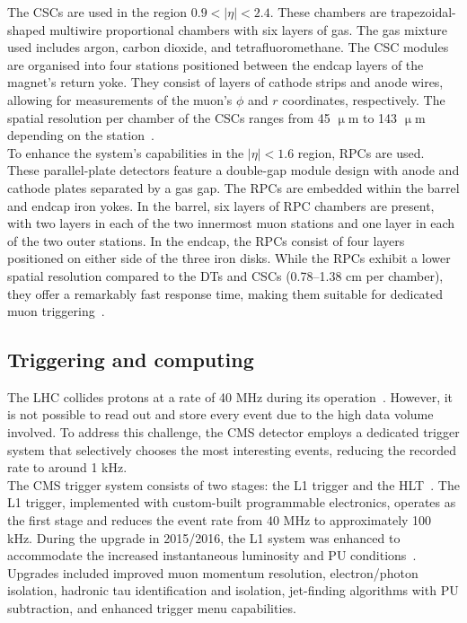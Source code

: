 The \ac{CSC}s are used in the region $0.9 < |\eta| < 2.4$. 
These chambers are trapezoidal-shaped multiwire proportional chambers with six layers of gas. 
The gas mixture used includes argon, carbon dioxide, and tetrafluoromethane. 
The \ac{CSC} modules are organised into four stations positioned between the endcap layers of the magnet's return yoke. 
They consist of layers of cathode strips and anode wires, allowing for measurements of the muon's $\phi$ and $r$ coordinates, respectively. 
The spatial resolution per chamber of the \ac{CSC}s ranges from 45 $\upmu$m to 143 $\upmu$m depending on the station~\cite{CMS:2018rym}. \\

To enhance the system's capabilities in the $|\eta| < 1.6$ region, \ac{RPC}s are used. 
These parallel-plate detectors feature a double-gap module design with anode and cathode plates separated by a gas gap. 
The \ac{RPC}s are embedded within the barrel and endcap iron yokes. 
In the barrel, six layers of \ac{RPC} chambers are present, with two layers in each of the two innermost muon stations and one layer in each of the two outer stations. 
In the endcap, the \ac{RPC}s consist of four layers positioned on either side of the three iron disks. 
While the \ac{RPC}s exhibit a lower spatial resolution compared to the \ac{DT}s and \ac{CSC}s (0.78–1.38 cm per chamber), they offer a remarkably fast response time, making them suitable for dedicated muon triggering~\cite{CMS:2018rym}.

\subsection{Triggering and computing}

The \ac{LHC} collides protons at a rate of 40 MHz during its operation~\cite{Evans:2008zzb}. 
However, it is not possible to read out and store every event due to the high data volume involved. 
To address this challenge, the \ac{CMS} detector employs a dedicated trigger system that selectively chooses the most interesting events, reducing the recorded rate to around 1 kHz. \\

The \ac{CMS} trigger system consists of two stages: the \ac{L1} trigger and the \ac{HLT}~\cite{CMS_Setup,CMS_trigger,Tapper:2013yva}. 
The \ac{L1} trigger, implemented with custom-built programmable electronics, operates as the first stage and reduces the event rate from 40 MHz to approximately 100 kHz. 
During the upgrade in 2015/2016, the \ac{L1} system was enhanced to accommodate the increased instantaneous luminosity and \ac{PU} conditions~\cite{Tapper:2013yva}. 
Upgrades included improved muon momentum resolution, electron/photon isolation, hadronic tau identification and isolation, jet-finding algorithms with \ac{PU} subtraction, and enhanced trigger menu capabilities. \\

